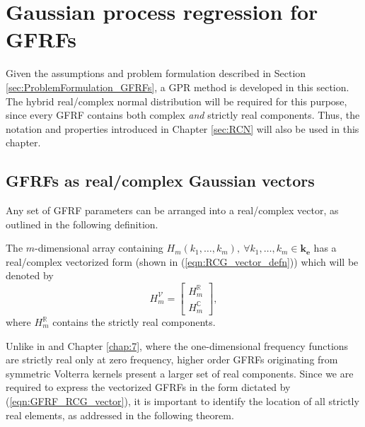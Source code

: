 \section{Gaussian process regression for GFRFs}
\label{sec:GPR_GFRFs}

Given the assumptions and problem formulation described in Section \ref{sec:ProblemFormulation_GFRFs}, a GPR method is developed in this section. The hybrid real/complex normal distribution will be required for this purpose, since every GFRF contains both complex \emph{and} strictly real components. Thus, the notation and properties introduced in Chapter \ref{sec:RCN} will also be used in this chapter.

\subsection{GFRFs as real/complex Gaussian vectors}

Any set of GFRF parameters can be arranged into a real/complex vector, as outlined in the following definition.

\begin{defn}
The $m$-dimensional array containing $H_m(k_1, \hdots,k_m), \ \forall k_1, \hdots,k_m \in \mathbf{k_e}$ has a real/complex vectorized form (shown in (\ref{eqn:RCG_vector_defn})) which will be denoted by 
\begin{equation}
\label{eqn:GFRF_RCG_vector}
H_m^{\mathcal{V}} = \begin{bmatrix} H_m^{\mathbb{R}} \\ H_m^{\mathbb{C}} \end{bmatrix}, 
\end{equation}
where $H_m^{\mathbb{R}}$ contains the strictly real components.
\end{defn}

Unlike in \cite{Lataire2016} and Chapter \ref{chap:7}, where the one-dimensional frequency functions are strictly real only at zero frequency, higher order GFRFs originating from symmetric Volterra kernels present a larger set of real components. Since we are required to express the vectorized GFRFs in the form dictated by (\ref{eqn:GFRF_RCG_vector}), it is important to identify the location of all strictly real elements, as addressed in the following theorem.

